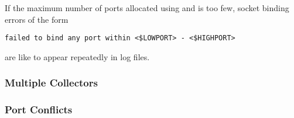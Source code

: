 If the maximum number of ports allocated using 
 and 
is too few,
socket binding errors of the form
\footnotesize
\begin{verbatim}
failed to bind any port within <$LOWPORT> - <$HIGHPORT>
\end{verbatim}
\normalsize
are like to appear repeatedly in log files.

\subsubsection{\label{sec:Ports-MultipleCollectors}Multiple Collectors}
\Todo


\subsubsection{\label{sec:Ports-Conflicts}Port Conflicts}
\Todo

